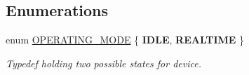 \subsection*{Enumerations}
\begin{DoxyCompactItemize}
\item 
\mbox{\label{logging-device_8ino_a980e950615d86dadef54f3cfaefb5fb4}} 
enum \hyperlink{logging-device_8ino_a980e950615d86dadef54f3cfaefb5fb4}{O\+P\+E\+R\+A\+T\+I\+N\+G\+\_\+\+M\+O\+DE} \{ {\bfseries I\+D\+LE}, 
{\bfseries R\+E\+A\+L\+T\+I\+ME}
 \}\begin{DoxyCompactList}\small\item\em Typedef holding two possible states for device. \end{DoxyCompactList}
\end{DoxyCompactItemize}
